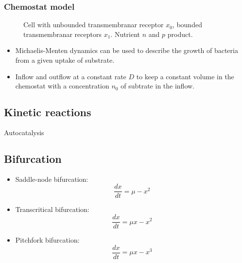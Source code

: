 \subsubsection{Chemostat model}
\begin{figure}[h]
\caption{Cell with unbounded transmembranar receptor $x_0$, bounded transmembranar receptors $x_1$. Nutrient $n$ and $p$ product.}
\end{figure}
\begin{itemize}
\item Michaelis-Menten dynamics can be used to describe the growth of bacteria from a given uptake of substrate.
\item Inflow and outflow at a constant rate $D$ to keep a constant volume in the chemostat with a concentration $n_0$ of subtrate in the inflow.
\end{itemize}
\subsection{Kinetic reactions}
Autocatalysis
\subsection{Bifurcation}
\begin{itemize}
\item Saddle-node bifurcation:
$$\frac{dx}{dt}=\mu  - x^2$$
\item Transcritical bifurcation:
$$\frac{dx}{dt}=\mu x - x^2$$
\item Pitchfork bifurcation:
$$\frac{dx}{dt}=\mu x - x^3$$
\end{itemize}

%
